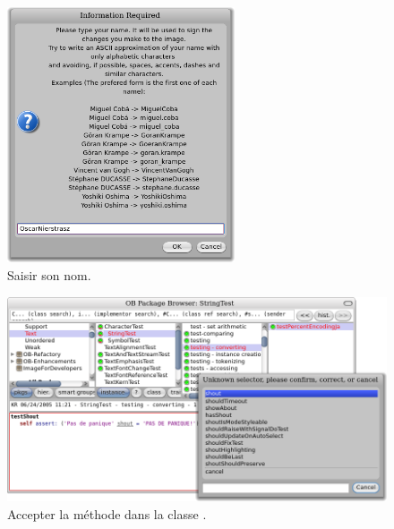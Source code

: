 \documentclass[a4paper,10pt,twoside]{book}
\begin{document}

\begin{figure}[htb]
 \centerline {\includegraphics[width=0.6\textwidth]{name}}
 \caption{Saisir son nom.}
 \end{figure}

\begin{figure}[htb]
 	{\centerline {\includegraphics[width=\textwidth]{testShoutConfirm}}}
 \caption{Accepter la méthode  dans la classe .
 }
 \end{figure}
\end{document}
